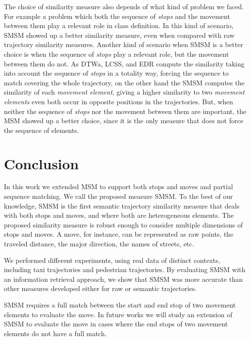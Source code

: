 \documentclass[12pt]{article}
\begin{document}
{The choice of similarity measure also depends of what kind of problem we faced. For example a problem which both the sequence of \emph{stops} and the movement between them play a relevant role in class definition. In this kind of scenario, SMSM showed up a better similarity measure, even when compared with raw trajectory similarity measures. Another kind of scenario when SMSM is a better choice is when the sequence of \emph{stops} play a relevant role, but the movement between them do not. As DTWa, LCSS, and EDR compute the similarity taking into account the sequence of \emph{stops} in a totality way, forcing the sequence to match covering the whole trajectory, on the other hand the SMSM computes the similarity of each \emph{movement element}, giving a higher similarity to two \emph{movement elements} even both occur in opposite positions in the trajectories. But, when neither the sequence of \emph{stops} nor the movement between them are important, the MSM showed up a better choice, since it is the only measure that does not force the sequence of elements.}

\section{Conclusion} \label{sec:conclusions}
In this work we extended MSM to support both stops and moves and partial sequence matching. We call the proposed measure SMSM. To the best of our knowledge, SMSM is the first semantic trajectory similarity measure that deals with both stops and moves, and where both are heterogeneous elements. 
The proposed similarity measure is robust enough to consider multiple dimensions of stops and moves. A move, for instance, can be represented as raw points, the traveled distance, the major direction, the names of streets, etc.

We performed different experiments, using real data of distinct contexts, including taxi trajectories and pedestrian trajectories. By evaluating SMSM with an information retrieval approach, we show that SMSM was more accurate than other measures developed either for raw or semantic trajectories.

SMSM requires a full match between the start and end stop of two movement elements to evaluate the move. In future works we will study an extension of SMSM to evaluate the move in cases where the end stops of two movement elements do not have a full match.



\end{document}
